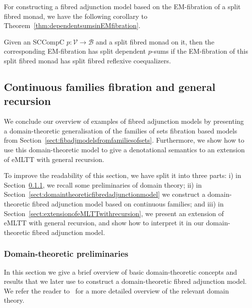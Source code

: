 For constructing a fibred adjunction model based on the EM-fibration of a split fibred monad, we have the following corollary to Theorem~\ref{thm:dependentsumsinEMfibration}.

\begin{corollary}
Given an SCCompC $p : \mathcal{V} \longrightarrow \mathcal{B}$ and a split fibred monad on it, then the corresponding EM-fibration has split dependent $p$-sums if the EM-fibration of this split fibred monad has split fibred reflexive coequalizers.
\end{corollary}



\subsection{Continuous families fibration and general recursion}
\label{sect:continuousfamilies}

We conclude our overview of examples of fibred adjunction models by presenting a domain-theoretic generalisation of the families of sets fibration based models from Section~\ref{sect:fibadjmodelsfromfamiliesofsets}. Furthermore, we show how to use this domain-theoretic  model to give a denotational semantics to an extension of eMLTT with general recursion.

To improve the readability of this section, we have split it into three parts: i) in Section~\ref{sect:domaintheorypreliminaries}, we recall some preliminaries of domain theory; ii) in Section~\ref{sect:domaintheoreticfibredadjunctionmodel} we construct a domain-theoretic fibred adjunction model based on continuous families; and iii) in Section~\ref{sect:extensionofeMLTTwithrecursion}, we present an extension of eMLTT with general recursion, and show how to interpret it in our domain-theoretic fibred adjunction model.

\subsubsection{Domain-theoretic preliminaries}
\label{sect:domaintheorypreliminaries}

In this section we give a brief overview of basic domain-theoretic concepts and results that we later use to construct a domain-theoretic fibred adjunction model. We refer the reader to~\cite{Gierz:ContinuousLattices,Plotkin:PisaNotes,Abramsky:DomainTheory} for a more detailed overview of the relevant domain theory. 

